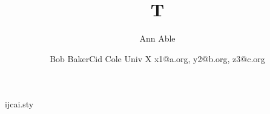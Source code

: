 \begin{filecontents*}[overwrite]{ijcai.sty}
\def\maketitle{\par\begingroup\@maketitle\endgroup
  \let\maketitle\relax \let\@maketitle\relax
  \gdef\@author{}\gdef\@title{}}
\def\@maketitle{\vbox{\centering{\LARGE\bf \@title \par}\vskip 0.2in
  {\def\and{\unskip\thinspace{\rm ,}\enspace}%
   \def\And{\unskip\enspace{\rm and}\enspace}%
   \def\affiliations{\egroup\par\bgroup\rm}%
   \def\emails{\egroup\par\bgroup\rm}%
   \bgroup\bf\@author\egroup}}}
\end{filecontents*}
\documentclass{article}
\usepackage{ijcai}
\title{T}
\author{Ann Able\and Bob Baker\And Cid Cole
\affiliations Univ X
\emails x1@a.org, y2@b.org, z3@c.org}

\maketitle

